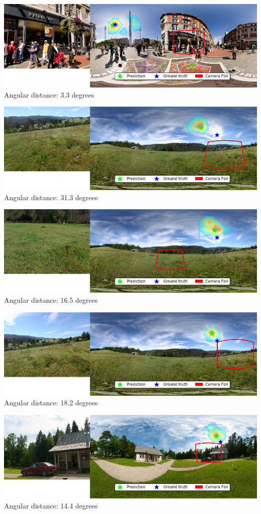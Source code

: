 \begin{multicols}{2}
\includegraphics[width=\mywidth]{pano_aasokgzjhapcau_004.jpg}\\
Angular distance: 3.3 degrees

\includegraphics[width=\mywidth]{pano_aaxximpglpmmvj_005.jpg}\\
Angular distance: 31.3 degrees

\includegraphics[width=\mywidth]{pano_aaxximpglpmmvj_002.jpg}\\
Angular distance: 16.5 degrees

\includegraphics[width=\mywidth]{pano_aaxximpglpmmvj_004.jpg}\\
Angular distance: 18.2 degrees

\includegraphics[width=\mywidth]{pano_aazdyyemiqnyfe_005.jpg}\\
Angular distance: 14.4 degrees


\end{multicols}
